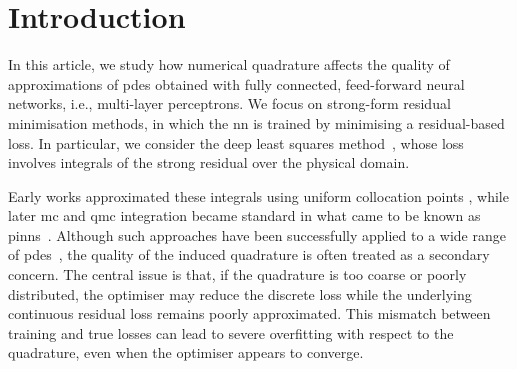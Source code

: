\documentclass[oneside,reqno,11pt,a4paper]{amsart}
\theoremstyle{definition}
\begin{document}
\begin{abstract}
We study the role of numerical quadrature in residual-minimisation methods for neural network approximation of partial differential equations. We first present an abstract error framework that separates approximation, quadrature and optimisation errors, and derive a nonlinear Strang-type estimate quantifying how inaccuracies in the discrete loss affect the final approximation. Motivated by this analysis, we propose an anisotropic adaptive composite quadrature strategy that controls the relative quadrature error of the residual loss using richer reference quadratures and bisection-based refinement. We then introduce a refresh-based training methodology that rebuilds the quadrature only when an online error indicator exceeds a prescribed threshold, balancing accuracy and computational cost. Numerical experiments on a range of benchmark problems show that the proposed approach narrows the gap between training and reference losses, uses quadrature points more efficiently and delivers strong approximation accuracy relative to non-adaptive quadrature strategies.
\end{abstract} 

\maketitle 

\section{Introduction}

In this article, we study how numerical quadrature affects the quality of
approximations of \acp{pde} obtained with fully connected, feed-forward neural
networks, i.e., multi-layer perceptrons. We focus on
strong-form residual minimisation methods, in which the \ac{nn} is
trained by minimising a residual-based loss. In particular, we consider the
deep least squares method~\cite{Dissanayake1994, DGM2018, DLS-Cai-2020}, whose loss
involves integrals of the strong residual over the physical domain. 

Early works
approximated these integrals using uniform collocation points
\cite{Lagaris1998}, while later \ac{mc} and \ac{qmc} integration
became standard in what came to be known as \acp{pinn}~\cite{PINNs2019}.
Although such approaches have been successfully applied to a wide range of
\acp{pde}~\cite{UrbanPINNOpt2025}, the quality of
the induced quadrature is often treated as a secondary concern.
The central issue is that, if the quadrature is too coarse or poorly
distributed, the optimiser may reduce the discrete loss while the underlying
continuous residual loss remains poorly approximated. This mismatch between training and true losses can lead to severe overfitting with respect to the quadrature, even when the optimiser appears to converge. 
\end{document}
